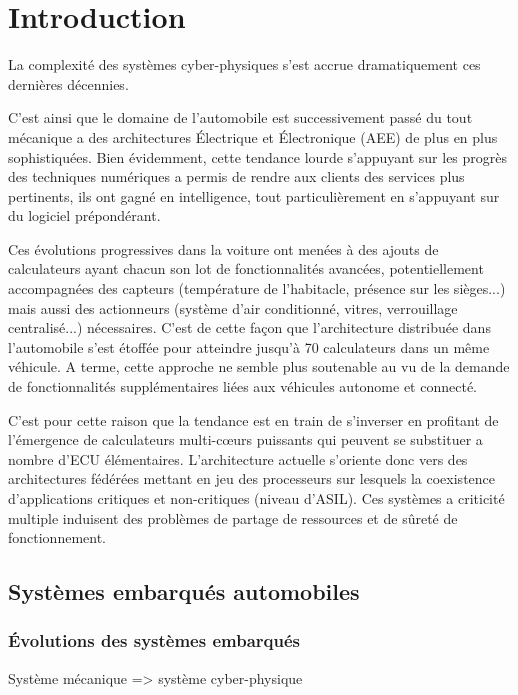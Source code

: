 \documentclass[french, a4paper, 11pt, twoside, pdftex]{StyleThese}
\begin{document}
\fi


\chapter*{Introduction}

La complexité des systèmes cyber-physiques s’est accrue dramatiquement  ces dernières décennies. 

C'est ainsi que le domaine de l'automobile est successivement passé du tout mécanique a des architectures Électrique et Électronique (AEE) de plus en plus sophistiquées. Bien évidemment, cette tendance lourde s’appuyant sur les progrès des techniques numériques a permis de rendre aux clients des services plus pertinents, ils ont gagné en intelligence, tout particulièrement en s’appuyant sur du logiciel prépondérant. 

Ces évolutions progressives dans la voiture ont menées à des ajouts de calculateurs ayant chacun son lot de fonctionnalités avancées, potentiellement accompagnées des capteurs (température de l'habitacle, présence sur les sièges...) mais aussi des actionneurs (système d'air conditionné, vitres, verrouillage centralisé...) nécessaires.
C'est de cette façon que l'architecture distribuée dans l'automobile s'est étoffée pour atteindre jusqu'à 70 calculateurs dans un même véhicule. A terme, cette approche ne semble plus soutenable au vu de la demande de fonctionnalités supplémentaires liées aux véhicules autonome et connecté.

C’est pour cette raison que la tendance est en train de s’inverser en profitant de l’émergence de calculateurs multi-cœurs puissants qui peuvent se substituer a nombre d’ECU élémentaires. L’architecture actuelle s’oriente donc vers des architectures fédérées mettant en jeu des processeurs sur lesquels la coexistence d’applications critiques et non-critiques (niveau d’ASIL). Ces systèmes a criticité multiple  induisent des problèmes de partage de ressources et de sûreté de fonctionnement.

\section*{Systèmes embarqués automobiles}
    \subsection*{Évolutions des systèmes embarqués}
        Système mécanique => système cyber-physique
\end{document}
